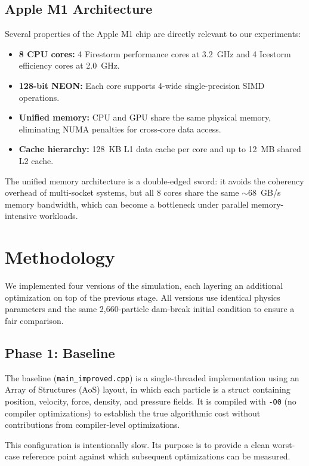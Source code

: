 \documentclass[12pt, a4paper]{article}
\begin{document}
\subsection{Apple M1 Architecture}
Several properties of the Apple M1 chip \cite{apple2020m1} are directly relevant to our experiments:
\begin{itemize}
    \item \textbf{8 CPU cores:} 4 Firestorm performance cores at 3.2~GHz and 4 Icestorm efficiency cores at 2.0~GHz.
    \item \textbf{128-bit NEON:} Each core supports 4-wide single-precision SIMD operations.
    \item \textbf{Unified memory:} CPU and GPU share the same physical memory, eliminating NUMA penalties for cross-core data access.
    \item \textbf{Cache hierarchy:} 128~KB L1 data cache per core and up to 12~MB shared L2 cache.
\end{itemize}
The unified memory architecture is a double-edged sword: it avoids the coherency overhead of multi-socket systems, but all 8 cores share the same $\sim$68~GB/s memory bandwidth, which can become a bottleneck under parallel memory-intensive workloads.

\section{Methodology}

We implemented four versions of the simulation, each layering an additional optimization on top of the previous stage. All versions use identical physics parameters and the same 2,660-particle dam-break initial condition to ensure a fair comparison.

\subsection{Phase 1: Baseline}
The baseline (\texttt{main\_improved.cpp}) is a single-threaded implementation using an Array of Structures (AoS) layout, in which each particle is a struct containing position, velocity, force, density, and pressure fields. It is compiled with \texttt{-O0} (no compiler optimizations) to establish the true algorithmic cost without contributions from compiler-level optimizations.

This configuration is intentionally slow. Its purpose is to provide a clean worst-case reference point against which subsequent optimizations can be measured.
\end{document}
